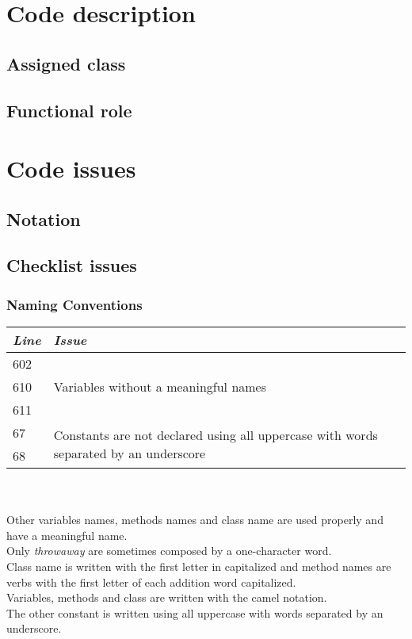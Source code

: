 \documentclass[11pt,a4paper]{report}
\begin{document}


\thispagestyle{empty}
\tableofcontents
\cleardoublepage
{}
\pagestyle{fancy}

\chapter{Code description}
\section{Assigned class}
\section{Functional role}
\chapter{Code issues}
\section{Notation}
\section{Checklist issues}
\subsection{Naming Conventions}
\begin{tabularx}{\textwidth}{|l|X|}
	\hline
	\textit{Line} & \textit{Issue}\\
	\hline
	602 & \multirow{3}{*}{Variables without a meaningful names}\\
	610 & \\
	611 & \\
	\hline
	\hline
	67 & \multirow{2}{\linewidth}{{Constants are not declared using all uppercase with words separated by an underscore}}\\
	68 & \\
	\hline
\end{tabularx}
\\\\
Other variables names, methods names and class name are used properly and have a meaningful name.\\Only \textit{throwaway} are sometimes composed by a one-character word.\\Class name is written with the first letter in capitalized and method names are verbs with the first letter of each addition word capitalized.\\Variables, methods and class are written with the camel notation.\\The other constant is written using all uppercase with words separated by an underscore.
\end{document}
